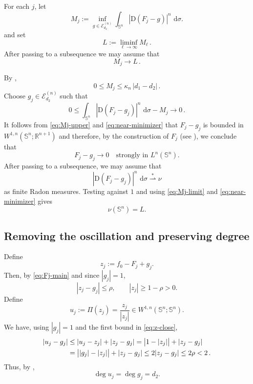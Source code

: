 \documentclass[11pt,reqno]{amsart}
\numberwithin{equation}{section}
\newcommand{\Sph}{\mathbb S}
\newcommand{\R}{\mathbb R}
\newcommand{\E}{\mathcal E}
\newcommand{\D}{\mathrm D}
\newcommand{\dd}{\,\mathrm d}
\newcommand{\weakstar}{\mathrel{\stackrel{*}{\rightharpoonup}}}
\begin{document}
For each $j$, let
\begin{equation}\label{eq:Mj}
  M_j:=\inf_{g\in\E_{d_2}^{(n)}}
  \int_{\Sph^n}|\D(F_j-g)|^n\,\dd\sigma.
\end{equation}
and set
\[
L:=\liminf_{\ell\to\infty}M_\ell \,.
\]
After passing to a subsequence we may assume that
\begin{equation}\label{eq:Mj-limit}
  M_j\to L \,.
\end{equation}

By ,
\begin{equation}\label{eq:Mj-upper}
  0\le M_j\le\kappa_n \, |d_1-d_2|\,.
\end{equation}
Choose $g_j\in\E_{d_2}^{(n)}$ such that
\begin{equation}\label{eq:near-minimizer}
  0 \le\int_{\Sph^n}|\D(F_j-g_j)|^n\,\dd\sigma - M_j \to 0 \,.
\end{equation}
It follows from \eqref{eq:Mj-upper} and \eqref{eq:near-minimizer} that $F_j-g_j$ is bounded in $W^{1,n}(\Sph^n;\R^{n+1})$ and therefore, by the construction of $F_j$ (see ), we conclude that
\begin{equation}\label{eq:h-to-zero}
  F_j- g_j \to0\quad\text{strongly in }L^n(\Sph^n).
\end{equation}
After passing to a subsequence, we may assume that
\begin{equation}\label{eq:nu-limit}
  |\D (F_j-g_j)|^n\,\dd\sigma\weakstar\nu
\end{equation}
as finite Radon measures.  Testing against $1$ and using \eqref{eq:Mj-limit} and \eqref{eq:near-minimizer} gives
\begin{equation}\label{eq:nu-total}
  \nu(\Sph^n)=L.
\end{equation}


\subsection{Removing the oscillation and preserving degree}
Define
\begin{equation}\label{eq:zj}
  z_j:=f_0-F_j + g_j.
\end{equation}
Then, by \eqref{eq:Fj-main} and since $|g_j|=1$,
\begin{equation}\label{eq:z-close}
  |z_j-g_j|\le\rho,
  \qquad |z_j|\ge1-\rho>0.
\end{equation}
Define
\begin{equation}\label{eq:uj}
  u_j:=\Pi(z_j)=\frac{z_j}{|z_j|}
  \in W^{1,n}(\Sph^n;\Sph^n).
\end{equation}
We have, using $|g_j|=1$ and the first bound in \eqref{eq:z-close},
\begin{align}\label{eq:u-g-close}
  |u_j-g_j|
  & \le|u_j-z_j|+|z_j-g_j|
  =\bigl|1 - |z_j| \bigr|+|z_j-g_j| \notag \\
  & = \bigl| |g_j| - |z_j| \bigr|+|z_j-g_j| \le 2 |z_j-g_j|
  \le2\rho<2 \,.
\end{align}
Thus, by ,
\begin{equation}\label{eq:u-degree}
  \deg u_j=\deg g_j=d_2.
\end{equation}
\end{document}
